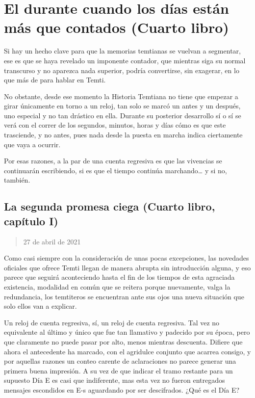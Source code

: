 \documentclass[
]{book}
\begin{document}
\hypertarget{el-durante-cuando-los-duxedas-estuxe1n-muxe1s-que-contados-cuarto-libro}{%
\chapter{El durante cuando los días están más que contados (Cuarto libro)}\label{el-durante-cuando-los-duxedas-estuxe1n-muxe1s-que-contados-cuarto-libro}}

Si hay un hecho clave para que la memorias temtianas se vuelvan a segmentar, ese es que se haya revelado un imponente contador, que mientras siga su normal transcurso y no aparezca nada superior, podría convertirse, sin exagerar, en lo que más de para hablar en Temti.

No obstante, desde ese momento la Historia Temtiana no tiene que empezar a girar únicamente en torno a un reloj, tan solo se marcó un antes y un después, uno especial y no tan drástico en ella. Durante su posterior desarrollo sí o sí se verá con el correr de los segundos, minutos, horas y días cómo es que este trasciende, y no antes, pues nada desde la puesta en marcha indica ciertamente que vaya a ocurrir.

Por esas razones, a la par de una cuenta regresiva es que las vivencias se continuarán escribiendo, si es que el tiempo continúa marchando\ldots{} y si no, también.

\hypertarget{la-segunda-promesa-ciega-cuarto-libro-capuxedtulo-i}{%
\section{La segunda promesa ciega (Cuarto libro, capítulo I)}\label{la-segunda-promesa-ciega-cuarto-libro-capuxedtulo-i}}

\begin{quote}
27 de abril de 2021
\end{quote}

Como casi siempre con la consideración de unas pocas excepciones, las novedades oficiales que ofrece Temti llegan de manera abrupta sin introducción alguna, y eso parece que seguirá aconteciendo hasta el fin de los tiempos de esta agraciada existencia, modalidad en común que se reitera porque nuevamente, valga la redundancia, los temtiteros se encuentran ante sus ojos una nueva situación que solo ellos van a explicar.

Un reloj de cuenta regresiva, sí, un reloj de cuenta regresiva. Tal vez no equivalente al último y único que fue tan llamativo y padecido por su época, pero que claramente no puede pasar por alto, menos mientras descuenta. Difiere que ahora el antecedente ha marcado, con el agridulce conjunto que acarrea consigo, y por aquellas razones un conteo carente de aclaraciones no parece generar una primera buena impresión. A su vez de que indicar el tramo restante para un supuesto Día E es casi que indiferente, mas esta vez no fueron entregados mensajes escondidos en E-s aguardando por ser descifrados. ¿Qué es el Día E?
\end{document}
